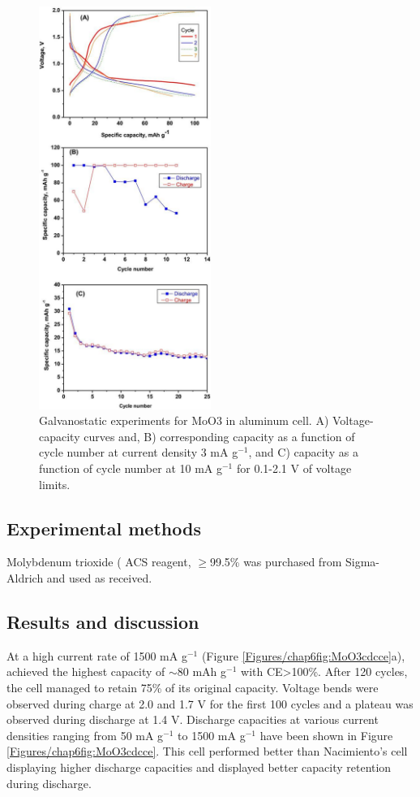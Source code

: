 \begin{figure}[th!]
\centering
\includegraphics[width=0.5\textwidth]{Figures/chap6fig/moo3pap}
\caption{Galvanostatic experiments for MoO3 in aluminum cell. A) Voltage-capacity curves and, B) corresponding capacity as a function of cycle number at current density 3 mA g$^{-1}$, and C) capacity as a function of cycle number at 10 mA g$^{-1}$ for 0.1-2.1 V of voltage limits.}
\label{Figures/chap6fig:moo3pap}
\end{figure}

\subsection{Experimental methods}
Molybdenum trioxide ( ACS reagent, $\geq$99.5\% was purchased from Sigma-Aldrich and used as received.

\subsection{Results and discussion}
At a high current rate of 1500 mA g$^{-1}$ (Figure \ref{Figures/chap6fig:MoO3cdcce}a), achieved the highest capacity of $\sim$80 mAh g$^{-1}$ with CE>100\%. After 120 cycles, the cell managed to retain 75\% of its original capacity. Voltage bends were observed during charge at 2.0 and 1.7 V for the first 100 cycles and a plateau was observed during discharge at 1.4 V. Discharge capacities at various current densities ranging from 50 mA g$^{-1}$ to 1500 mA g$^{-1}$ have been shown in Figure \ref{Figures/chap6fig:MoO3cdcce}. This cell performed better than Nacimiento's cell displaying higher discharge capacities and displayed better capacity retention during discharge.  

